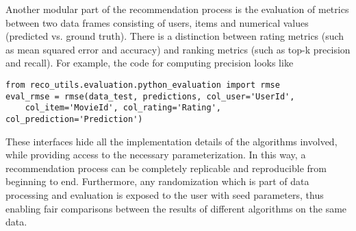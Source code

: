 Another modular part of the recommendation process is the evaluation of metrics between two data frames consisting of users, items and numerical values 
(predicted vs. ground truth). There is a distinction between rating metrics (such as mean squared error and accuracy) and ranking metrics 
(such as top-k precision and recall). For example, the code for computing precision looks like
\begin{verbatim}
from reco_utils.evaluation.python_evaluation import rmse
eval_rmse = rmse(data_test, predictions, col_user='UserId', 
    col_item='MovieId', col_rating='Rating', col_prediction='Prediction')
\end{verbatim}
 
These interfaces hide all the implementation details of the algorithms involved, while providing access to the necessary parameterization.
In this way, a recommendation process can be completely replicable and reproducible from beginning to end. Furthermore, any randomization 
which is part of data processing and evaluation is exposed to the user with seed parameters, thus enabling fair comparisons between the results of different algorithms
on the same data. 

